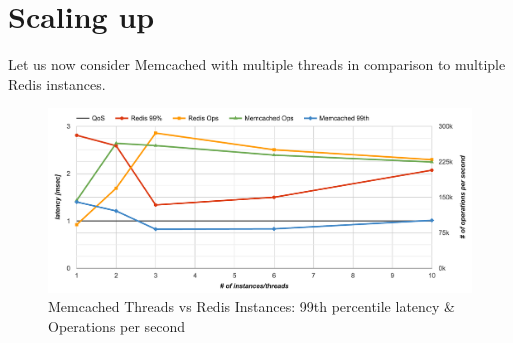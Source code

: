\section{Scaling up}
Let us now consider Memcached with multiple threads in comparison to multiple Redis instances.

\begin{figure}[h]
    \includegraphics[width=\textwidth]{./res2/mr_instances.png}
    \caption{Memcached Threads vs Redis Instances: 99th percentile latency \& Operations per second}
    \label{fig:mr_instances}
\end{figure}
